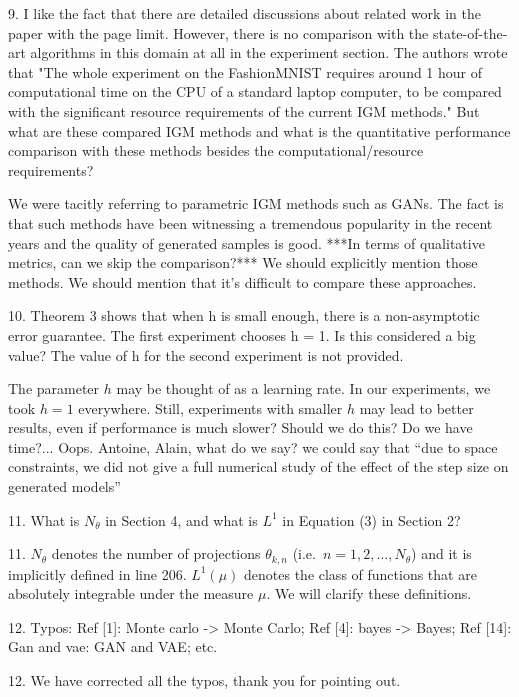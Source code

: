 \documentclass{article}
\newcommand{\rev}[1]{{\color{red} #1}}
\newcommand{\umut}[1]{{\color{blue} #1}}
\newcommand{\alain}[1]{{\color{cyan} #1}}
\newcommand{\antoine}[1]{{\color{orange} #1}}
\begin{document}
\rev{9. I like the fact that there are detailed discussions about related work in the paper with the page limit. However, there is no comparison with the state-of-the-art algorithms in this domain at all in the experiment section. The authors wrote that "The whole experiment on the FashionMNIST requires around 1 hour of computational time on the CPU of a standard laptop computer, to be compared with the significant resource requirements of the current IGM methods." But what are these compared IGM methods and what is the quantitative performance comparison with these methods besides the computational/resource requirements?}

\antoine{We were tacitly referring to parametric IGM methods such as GANs. The fact is that such methods have been witnessing a tremendous popularity in the recent years and the quality of generated samples is good. ***In terms of qualitative metrics, can we skip the comparison?***}
\umut{We should explicitly mention those methods. We should mention that it's difficult to compare these approaches.}

\rev{10. Theorem 3 shows that when h is small enough, there is a non-asymptotic error guarantee. The first experiment chooses h = 1. Is this considered a big value? The value of h for the second experiment is not provided.}

\antoine{The parameter $h$ may be thought of as a learning rate. In our experiments, we took $h=1$ everywhere. Still, experiments with smaller $h$ may lead to better results, even if performance is much slower? Should we do this? Do we have time?...}
\umut{Oops. Antoine, Alain, what do we say?} \alain{we could say that ``due to space constraints, we did not give a full numerical study of the effect of the step size on generated models''}

\rev{11. What is $N_\theta$ in Section 4, and what is $L^1$ in Equation (3) in Section 2?}

11. $N_\theta$ denotes the number of projections $\theta_{k,n}$ (i.e.\ $n = 1,2,\dots, N_\theta$) and it is implicitly defined in line 206. $L^1(\mu)$ denotes the class of functions that are absolutely integrable under the measure $\mu$. We will clarify these definitions.

\rev{12. Typos: Ref [1]: Monte carlo -> Monte Carlo; Ref [4]: bayes -> Bayes; Ref [14]: Gan and vae: GAN and VAE; etc.}

12. We have corrected all the typos, thank you for pointing out.
\end{document}
